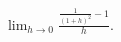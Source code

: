 \label{problemlimhto0(1/(1+h)^2-1)/h}
$ \displaystyle \lim_{h\to 0} \frac{\frac{1}{(1+h)^2}-1}{h}  $.


